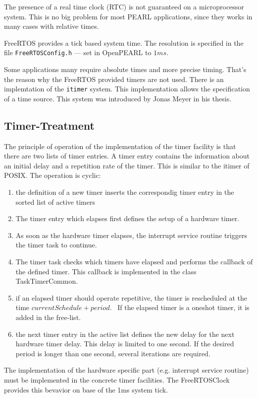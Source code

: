 The presence of a real time clock (RTC) is not guaranteed on a
microprocessor system.
This is no big problem for most PEARL applications, since they works 
in many cases with relative times.

FreeRTOS provides a tick based system time. The resolution is specified
in the file \texttt{FreeRTOSConfig.h} --- 
set in OpenPEARL to $1 ms$.

Some applications many require absolute times and more precise timing.
That's the reason why the FreeRTOS provided timers are not used. 
There is an implemtation of the \texttt{itimer} system. This 
implementation allows the specification of a time source.
This system was introduced  by Jonas Meyer in his thesis.

\subsection{Timer-Treatment}
The principle of operation of the implementation of the timer facility is
that there are two lists of timer entries. A timer entry contains 
the information about an initial delay and a repetition rate of the timer.
This is similar to the itimer of POSIX.
The operation is cyclic:
\begin{enumerate}
\item the definition of a new timer inserts the correspondig timer entry
   in the sorted list of active timers
\item The timer entry which elapses first defines the setup of a hardware timer.
\item As soon as the hardware timer elapses, the interrupt service  routine
triggers the timer task to continue.
\item The timer task checks which timers have elapsed and performs the 
callback of the defined timer. This callback is implemented in the
class TaskTimerCommon.
\item if an elapsed timer should operate repetitive, the timer is rescheduled
   at the time $currentSchedule + period$. \
	If the elapsed timer is a oneshot timer, it is added in the free-list.
\item the next timer entry in the active list defines the new delay for the
  next hardware timer delay. This delay is limited to one second. If the 
  desired period is longer than one second, several iterations are required.
\end{enumerate}

The implementation of the hardware specific part
(e.g. interrupt service routine) must be implemented in the concrete
timer facilities. The FreeRTOSClock provides this bevavior on base
of the 1ms system tick.

